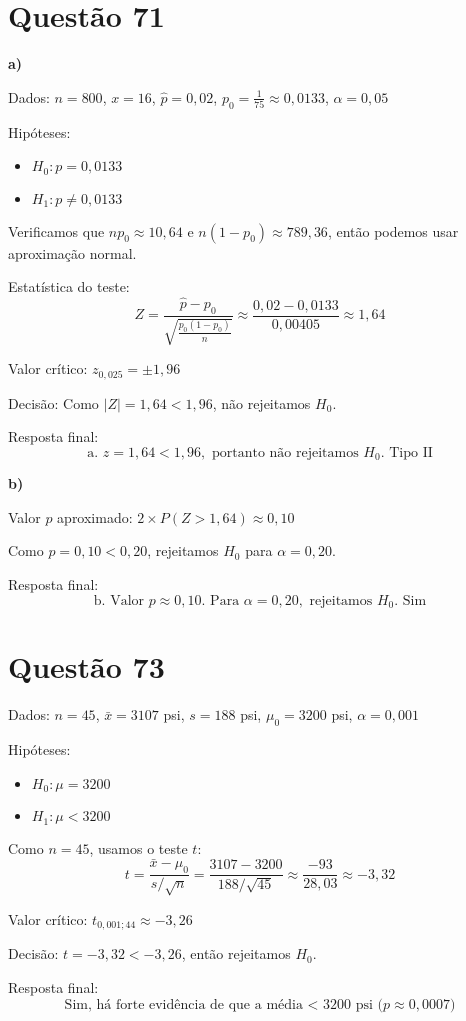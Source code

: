 \documentclass[12pt]{article}
\newcommand{\quest}[1]{\section*{Questão #1}} %
\begin{document}
\quest{71}

\textbf{a)}

Dados: $n = 800$, $x = 16$, $\hat{p} = 0{,}02$, $p_0 = \frac{1}{75} \approx 0{,}0133$, $\alpha = 0{,}05$

Hipóteses:
\begin{itemize}
  \item $H_0: p = 0{,}0133$
  \item $H_1: p \neq 0{,}0133$
\end{itemize}

Verificamos que $np_0 \approx 10{,}64$ e $n(1 - p_0) \approx 789{,}36$, então podemos usar aproximação normal.

Estatística do teste:
\[
Z = \frac{\hat{p} - p_0}{\sqrt{\frac{p_0(1 - p_0)}{n}}} \approx \frac{0{,}02 - 0{,}0133}{0{,}00405} \approx 1{,}64
\]

Valor crítico: $z_{0{,}025} = \pm 1{,}96$

Decisão: Como $|Z| = 1{,}64 < 1{,}96$, não rejeitamos $H_0$.

Resposta final:
\[
\boxed{\text{a. } z = 1{,}64 < 1{,}96, \text{ portanto não rejeitamos } H_0. \text{ Tipo II}}
\]

\textbf{b)}

Valor $p$ aproximado: $2 \times P(Z > 1{,}64) \approx 0{,}10$

Como $p = 0{,}10 < 0{,}20$, rejeitamos $H_0$ para $\alpha = 0{,}20$.

Resposta final:
\[
\boxed{\text{b. Valor } p \approx 0{,}10. \text{ Para } \alpha = 0{,}20, \text{ rejeitamos } H_0. \text{ Sim}}
\]

\quest{73}

Dados: $n = 45$, $\bar{x} = 3107$ psi, $s = 188$ psi, $\mu_0 = 3200$ psi, $\alpha = 0{,}001$

Hipóteses:
\begin{itemize}
  \item $H_0: \mu = 3200$
  \item $H_1: \mu < 3200$
\end{itemize}

Como $n = 45$, usamos o teste $t$:
\[
t = \frac{\bar{x} - \mu_0}{s / \sqrt{n}} = \frac{3107 - 3200}{188 / \sqrt{45}} \approx \frac{-93}{28{,}03} \approx -3{,}32
\]

Valor crítico: $t_{0{,}001; 44} \approx -3{,}26$

Decisão: $t = -3{,}32 < -3{,}26$, então rejeitamos $H_0$.

Resposta final:
\[
\boxed{\text{Sim, h\'a forte evid\^encia de que a m\'edia < 3200 psi ($p \approx 0{,}0007$)}}
\]
\end{document}

